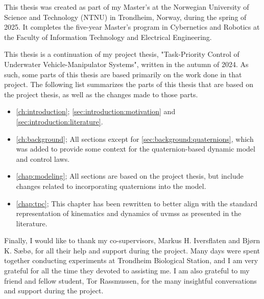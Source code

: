 This thesis was created as part of my Master's at the Norwegian University of Science and Technology (NTNU) in Trondheim, Norway, during the spring of 2025. It completes the five-year Master's program in Cybernetics and Robotics at the Faculty of Information Technology and Electrical Engineering.

This thesis is a continuation of my project thesis, "Task-Priority Control of Underwater Vehicle-Manipulator Systems", written in the autumn of 2024. As such, some parts of this thesis are based primarily on the work done in that project. The following list
summarizes the parts of this thesis that are based on the project thesis, as well as the changes made to those parts.

\begin{itemize}
    \item \autoref{ch:introduction}; \autoref{sec:introduction:motivation} and \autoref{sec:introduction:literature}.
    \item \autoref{ch:background}; All sections except for \autoref{sec:background:quaternions}, which was added to provide some context for the quaternion-based dynamic model and control laws.
    \item \autoref{chap:modeling}; All sections are based on the project thesis, but include changes related to incorporating quaternions into the model.
    \item \autoref{chap:tpc}; This chapter has been rewritten to better align with the standard representation of kinematics and dynamics of \gls{uvms}s as presented in the literature.
\end{itemize}

Finally, I would like to thank my co-supervisors, Markus H. Iversflaten and Bjørn K. Sæbø, for all their help and support during the project. Many days were spent together conducting experiments at Trondheim Biological Station, and I am very grateful for all the time they devoted to assisting me. I am also grateful to my friend and fellow student, Tor Rassmussen, for the many insightful conversations and support during the project.
